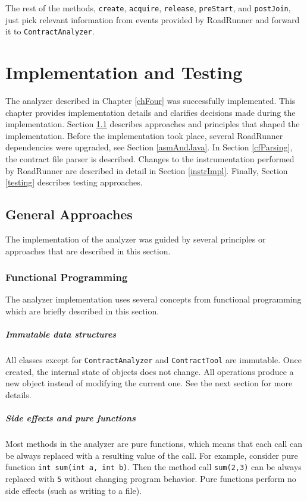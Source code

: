 The rest of the methods, \texttt{create}, \texttt{acquire}, \texttt{release},
\texttt{preStart}, and \texttt{postJoin}, just pick relevant information from
events provided by RoadRunner and forward it to \texttt{ContractAnalyzer}.



\chapter{Implementation and Testing}
\label{chFive}

The analyzer described in Chapter \ref{chFour} was successfully implemented.
This chapter provides implementation details and clarifies decisions made during
the implementation. Section \ref{approaches} describes approaches and principles
that shaped the implementation. Before the implementation took place, several
RoadRunner dependencies were upgraded, see Section \ref{asmAndJava}. In Section
\ref{cfParsing}, the contract file parser is described. Changes to the
instrumentation performed by RoadRunner are described in detail in Section
\ref{instrImpl}. Finally, Section \ref{testing} describes testing approaches.

\section{General Approaches}
\label{approaches}
The implementation of the analyzer was guided by several principles or
approaches that are described in this section.

\subsection{Functional Programming}
The analyzer implementation uses several concepts from functional programming
which are briefly described in this section.

\paragraph{Immutable data structures}
All classes except for \texttt{ContractAnalyzer} and \texttt{ContractTool} are
immutable. Once created, the internal state of objects does not change. All
operations produce a new object instead of modifying the current one. See the
next section for more details.

\paragraph{Side effects and pure functions}
Most methods in the analyzer are pure functions, which means that each call can
be always replaced with a resulting value of the call. For example, consider
pure function \texttt{int sum(int a, int b)}. Then the method call
\texttt{sum(2,3)} can be always replaced with \texttt{5} without changing
program behavior. Pure functions perform no side effects (such as writing to a
file).

